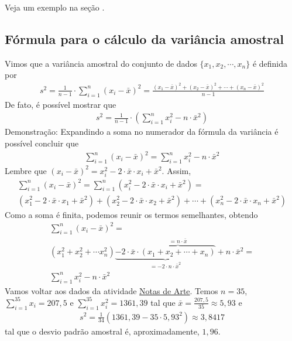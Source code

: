 {{{Veja um exemplo na seção .

\subsection{Fórmula para o cálculo da variância amostral}

Vimos que a variância amostral do conjunto de dados \(\{x_1,x_2,\cdots,x_n\}\) é definida por
\begin{equation*}
\begin{split}s^2 = \frac{1}{n-1}\cdot \sum^n_{i=1} (x_i-\bar{x})^2=\frac{(x_1-\bar{x})^2+(x_2-\bar{x})^2+\cdots+(x_n-\bar{x})^2}{n-1}\end{split}
\end{equation*}
De fato, é possível mostrar que
\begin{equation*}
\begin{split}s^2 = \frac{1}{n-1}\cdot \left (\sum^n_{i=1} x^2_i-n\cdot \bar{x}^2\right )\end{split}
\end{equation*}
Demonstração:  Expandindo a soma no numerador da fórmula da variância é possível concluir que
\begin{equation*}
\begin{split}\sum^n_{i=1}(x_i-\bar{x})^2= \sum^n_{i=1} x^2_i -n\cdot \bar{x}^2\end{split}
\end{equation*}
Lembre que \((x_i-\bar{x})^2=x^2_i-2\cdot \bar{x}\cdot x_i+\bar{x}^2\). Assim,
\begin{equation*}
\begin{split} \sum^n_{i=1}(x_i-\bar{x})^2=\sum^n_{i=1}(x^2_i-2\cdot \bar{x}\cdot x_i+\bar{x}^2)=\\ (x^2_1-2\cdot\bar{x}\cdot x_1+\bar{x}^2)+(x^2_2-2\cdot\bar{x}\cdot x_2+\bar{x}^2)+ \cdots + (x^2_n-2\cdot\bar{x}\cdot x_n+\bar{x}^2)\end{split}
\end{equation*}
Como a soma é finita, podemos reunir os termos semelhantes, obtendo
\needspace{10em}
\begin{equation*}
\begin{split}\sum^n_{i=1}(x_i-\bar{x})^2= \\ (x^2_1+x^2_2+\cdots x^2_n)\underbrace{-2\cdot \bar{x}\cdot \overbrace{(x_1+x_2+\cdots+x_n)}^{=n\cdot \bar{x}}}_{=-2\cdot n\cdot \bar{x}^2}+n\cdot \bar{x}^2= \\ \sum^n_{i=1} x^2_i-n\cdot\bar{x}^2\end{split}
\end{equation*}
Vamos voltar aos dados da atividade \hyperref[\detokenize{PE104-0:ativ-notas-de-artes}]{Notas de Arte}. Temos \(n=35\), \(\displaystyle{\sum^{35}_{i=1}}x_i=207{,}5\) e \(\displaystyle{\sum^{35}_{i=1}}x^2_i=1361{,}39\)  tal que \(\bar{x}=\frac{207{,}5}{35}\approx 5{,}93\) e
\begin{equation*}
\begin{split}s^2=\frac{1}{34}\left ( 1361{,}39-35\cdot 5{,}93^2\right )\approx 3{,}8417\end{split}
\end{equation*}
tal que o desvio padrão amostral é, aproximadamente, $1{,}96$.

}}}
